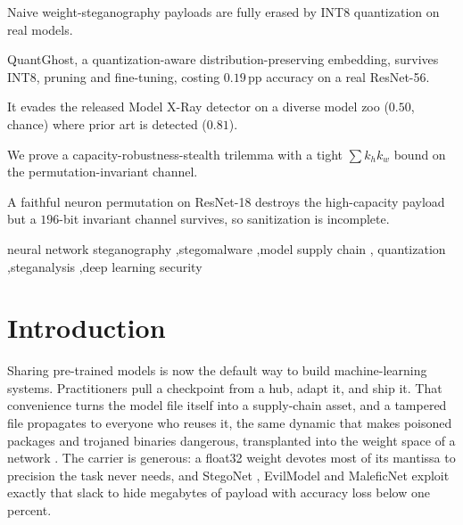 \documentclass[a4paper,fleqn]{cas-dc}
\theoremstyle{plain}
\theoremstyle{remark}
\newcommand{\sys}{\mbox{QuantGhost}}
\begin{document}
\begin{highlights}
\item Naive weight-steganography payloads are fully erased by INT8 quantization on real models.
\item \sys, a quantization-aware distribution-preserving embedding, survives INT8, pruning and fine-tuning, costing $0.19$\,pp accuracy on a real ResNet-56.
\item It evades the released Model X-Ray detector on a diverse model zoo ($0.50$, chance) where prior art is detected ($0.81$).
\item We prove a capacity-robustness-stealth trilemma with a tight $\sum k_h k_w$ bound on the permutation-invariant channel.
\item A faithful neuron permutation on ResNet-18 destroys the high-capacity payload but a $196$-bit invariant channel survives, so sanitization is incomplete.
\end{highlights}

\begin{keywords}
neural network steganography \sep stegomalware \sep model supply chain \sep
quantization \sep steganalysis \sep deep learning security
\end{keywords}

\maketitle

\section{Introduction}\label{sec:intro}
Sharing pre-trained models is now the default way to build machine-learning systems.
Practitioners pull a checkpoint from a hub, adapt it, and ship it. That convenience
turns the model file itself into a supply-chain asset, and a tampered file propagates
to everyone who reuses it, the same dynamic that makes poisoned packages and
trojaned binaries dangerous, transplanted into the weight space of a network
\citep{gu2017badnets,liu2018trojaning,digregorio2026insecurity}. The carrier is generous: a float32
weight devotes most of its mantissa to precision the task never needs, and StegoNet
\citep{liu2020stegonet}, EvilModel \citep{wang2021evilmodel,wang2022evilmodel2} and
MaleficNet \citep{hitaj2022maleficnet,hitaj2025trust} exploit exactly that slack to
hide megabytes of payload with accuracy loss below one percent.
\end{document}
